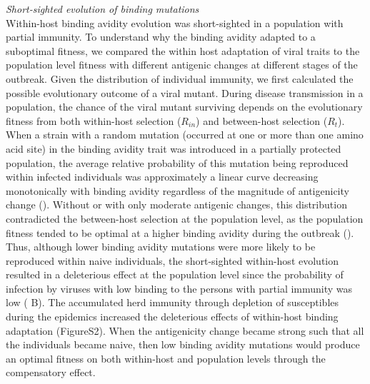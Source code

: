 \documentclass[12pt,a4paper]{article}
\begin{document}
{\it  Short-sighted evolution of binding mutations } \\
Within-host binding avidity evolution was short-sighted in a population with partial immunity. To understand why the binding avidity adapted to a suboptimal fitness, we compared the within host adaptation of viral traits to the population level fitness with different antigenic changes at different stages of the outbreak. Given the distribution of individual immunity, we first calculated the possible evolutionary outcome of a viral mutant. During disease transmission in a population, the chance of the viral mutant surviving depends on the evolutionary fitness from both within-host selection ($R_{in}$) and between-host selection ($R_{t}$). \\
When a strain with a random mutation (occurred at one or more than one amino acid site) in the binding avidity trait was introduced in a partially protected population, the average relative probability of this mutation being reproduced within infected individuals was approximately a linear curve decreasing monotonically with binding avidity regardless of the magnitude of antigenicity change (). Without or with only moderate antigenic changes, this distribution contradicted the between-host selection at the population level, as the population fitness tended to be optimal at a higher binding avidity during the outbreak (). Thus, although lower binding avidity mutations were more likely to be reproduced within naive individuals, the short-sighted within-host evolution resulted in a deleterious effect at the population level since the probability of infection by viruses with low binding to the persons with partial immunity was low ( B). The accumulated herd immunity through depletion of susceptibles during the epidemics increased the deleterious effects of within-host binding adaptation (FigureS2). When the antigenicity change became strong such that all the individuals became naive, then low binding avidity mutations would produce an optimal fitness on both within-host and population levels through the compensatory effect. \\
\end{document}
